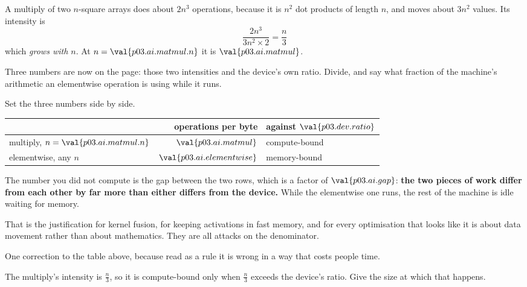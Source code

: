 \begin{fr}

A multiply of two $n$-square arrays does about $2n^{3}$ operations, because it
is $n^{2}$ dot products of length $n$, and moves about $3n^{2}$ values. Its
intensity is
\[ \frac{2n^{3}}{3n^{2} \times 2} = \frac{n}{3} \]
which \emph{grows with $n$}. At $n = \val{p03.ai.matmul.n}$ it is
$\val{p03.ai.matmul}$.

Three numbers are now on the page: those two intensities and the device's own
ratio. Divide, and say what fraction of the machine's arithmetic an
elementwise operation is using while it runs.
\dotline
\nextframe
\end{fr}

\begin{fr}

Set the three numbers side by side.

\begin{center}
\begin{tabular}{lrl}
\toprule
 & operations per byte & against $\val{p03.dev.ratio}$ \\
\midrule
multiply, $n = \val{p03.ai.matmul.n}$ & $\val{p03.ai.matmul}$ & compute-bound \\
elementwise, any $n$ & $\val{p03.ai.elementwise}$ & memory-bound \\
\bottomrule
\end{tabular}
\end{center}

The number you did not compute is the gap between the two rows, which is a
factor of $\val{p03.ai.gap}$: \textbf{the two pieces of work differ from each
other by far more than either differs from the device.} While the elementwise
one runs, the rest of the machine is idle waiting for memory.

That is the justification for kernel fusion, for keeping activations in fast
memory, and for every optimisation that looks like it is about data movement
rather than about mathematics. They are all attacks on the denominator.
\end{fr}

\begin{fr}
One correction to the table above, because read as a rule it is wrong in a way
that costs people time.

The multiply's intensity is $\frac{n}{3}$, so it is compute-bound only when
$\frac{n}{3}$ exceeds the device's ratio. Give the size at which that happens.
\nextframe
\end{fr}

